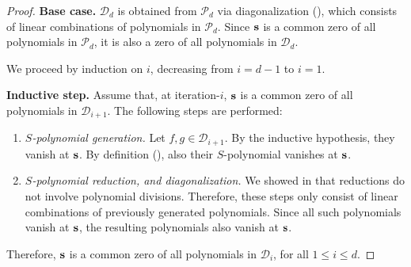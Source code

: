 \begin{proof}
\textbf{Base case.}  
$\mathcal{D}_d$ is obtained from $\mathcal{P}_d$ via diagonalization (\algdiag), which consists of linear combinations of polynomials in $\mathcal{P}_d$.  
Since $\mathbf{s}$ is a common zero of all polynomials in $\mathcal{P}_d$, it is also a zero of all polynomials in $\mathcal{D}_d$.

We proceed by induction on $i$, decreasing from $i=d-1$ to $i=1$.

\noindent
\textbf{Inductive step.}  
Assume that, at iteration-$i$, $\mathbf{s}$ is a common zero of all polynomials in $\mathcal{D}_{i+1}$.
The following steps are performed:
\begin{enumerate}
    \item \emph{$S$-polynomial generation.} Let $f,g\in\mathcal{D}_{i+1}$. By the inductive hypothesis, they vanish at $\mathbf{s}$. By definition (), also their $S$-polynomial vanishes at $\mathbf{s}$.

    \item \emph{$S$-polynomial reduction, and diagonalization.} We showed in  that reductions do not involve polynomial divisions.
    Therefore, these steps only consist of linear combinations of previously
    generated polynomials. Since all such polynomials vanish at
    $\mathbf{s}$, the resulting polynomials also vanish at $\mathbf{s}$.
\end{enumerate}
Therefore, $\mathbf{s}$ is a common zero of all polynomials in $\mathcal{D}_i$, for all $1 \le i \le d$.
\end{proof}






